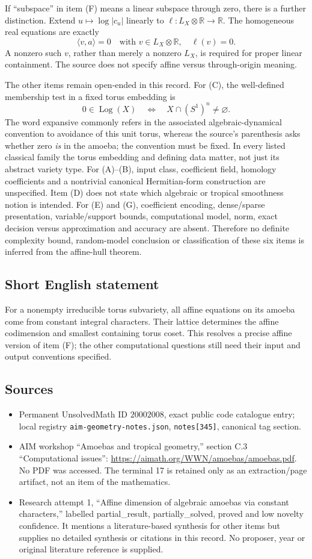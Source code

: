 \documentclass[11pt]{article}
\newcommand{\R}{\mathbb{R}}
\begin{document}
If ``subspace'' in item (F) means a linear subspace through zero, there is a further distinction. Extend \(u\mapsto\log|c_u|\) linearly to \(\ell:L_X\otimes\R\to\R\). The homogeneous real equations are exactly
\[
 \langle v,a\rangle=0\quad\text{with }v\in L_X\otimes\R,
 \quad\ell(v)=0.
\]
A nonzero such \(v\), rather than merely a nonzero \(L_X\), is required for proper linear containment. The source does not specify affine versus through-origin meaning.

The other items remain open-ended in this record. For (C), the well-defined membership test in a fixed torus embedding is
\[
 0\in\operatorname{Log}(X)\quad\Longleftrightarrow\quad
 X\cap(S^1)^n\ne\varnothing.
\]
The word expansive commonly refers in the associated algebraic-dynamical convention to avoidance of this unit torus, whereas the source's parenthesis asks whether zero \emph{is} in the amoeba; the convention must be fixed. In every listed classical family the torus embedding and defining data matter, not just its abstract variety type. For (A)--(B), input class, coefficient field, homology coefficients and a nontrivial canonical Hermitian-form construction are unspecified. Item (D) does not state which algebraic or tropical smoothness notion is intended. For (E) and (G), coefficient encoding, dense/sparse presentation, variable/support bounds, computational model, norm, exact decision versus approximation and accuracy are absent. Therefore no definite complexity bound, random-model conclusion or classification of these six items is inferred from the affine-hull theorem.
\subsection{Short English statement}
For a nonempty irreducible torus subvariety, all affine equations on its amoeba come from constant integral characters. Their lattice determines the affine codimension and smallest containing torus coset. This resolves a precise affine version of item (F); the other computational questions still need their input and output conventions specified.
\subsection{Sources}
\begin{itemize}
\item Permanent UnsolvedMath ID \(20002008\), exact public code catalogue entry; local registry \texttt{aim-geometry-notes.json}, \texttt{notes[345]}, canonical tag section.
\item AIM workshop ``Amoebas and tropical geometry,'' section C.3 ``Computational issues'': \url{https://aimath.org/WWN/amoebas/amoebas.pdf}. No PDF was accessed. The terminal 17 is retained only as an extraction/page artifact, not an item of the mathematics.
\item Research attempt 1, ``Affine dimension of algebraic amoebas via constant characters,'' labelled partial\_result, partially\_solved, proved and low novelty confidence. It mentions a literature-based synthesis for other items but supplies no detailed synthesis or citations in this record. No proposer, year or original literature reference is supplied.
\end{itemize}
\end{document}
